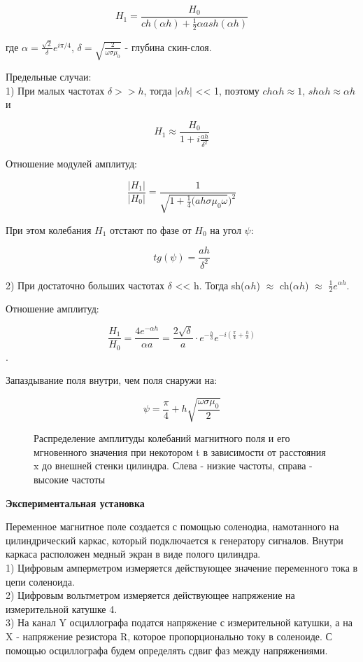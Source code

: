 \documentclass[a4paper,12pt]{article}
\begin{document}
$$H_1 = \frac{H_0}{ch(\alpha h) + \frac{1}{2}\alpha a sh(\alpha h)}$$

где $\alpha = \frac{\sqrt{2}}{\delta}e^{i\pi/4}$, $\delta = \sqrt{\frac{2}{\omega \sigma {\mu}_0}}$ - глубина скин-слоя. 

Предельные случаи: \\ 

1) При малых частотах $\delta >> h$, тогда $|\alpha h|$ << 1, поэтому $ch\alpha h \approx 1$, $sh \alpha h \approx \alpha h$ и 

$$H_1 \approx \frac{H_0}{1+i\frac{ah}{{\delta}^2}}$$

Отношение модулей амплитуд: 

$$\frac{|H_1|}{|H_0|} = \frac{1}{\sqrt{1 + \frac{1}{4}(ah\sigma{\mu}_0\omega})^2}$$

При этом колебания $H_1$ отстают по фазе от $H_0$ на угол $\psi$:

$$tg(\psi) = \frac{ah}{{\delta}^2}$$

2) При достаточно больших частотах $\delta$ << h. Тогда sh($\alpha h$) $\approx$ ch($\alpha h$) $\approx$ $\frac{1}{2}e^{\alpha h}$.

Отношение амплитуд: 

$$\frac{H_1}{H_0} = \frac{4e^{-\alpha h}}{\alpha a} = \frac{2\sqrt \delta}{a} \cdot e^{-\frac{h}{\delta}}e^{-i(\frac{\pi}{4} + \frac{h}{\delta})}$$. 

Запаздывание поля внутри, чем поля снаружи на: 

$$\psi = \frac{\pi}{4} + h\sqrt{\frac{\omega \sigma {\mu}_0}{2}}$$

\begin{figure}[htp]
\caption{Распределение амплитуды колебаний магнитного поля и его мгновенного значения при некотором t в зависимости от расстояния x до внешней стенки цилиндра. Слева - низкие частоты, справа - высокие частоты}
\end{figure}

\par\textbf{Экспериментальная установка}

Переменное магнитное поле создается с помощью соленодиа, намотанного на цилиндрический каркас, который подключается к генератору сигналов. Внутри каркаса расположен медный экран в виде полого цилиндра. \\ 
1) Цифровым амперметром измеряется действующее значение переменного тока в цепи соленоида. \\
2) Цифровым вольтметром измеряется действующее напряжение на измерительной катушке 4. \\
3) На канал Y осциллографа податся напряжение с измерительной катушки, а на X - напряжение резистора R, которое пропорционально току в соленоиде. С помощью осциллографа будем определять сдвиг фаз между напряжениями. 
\end{document}
